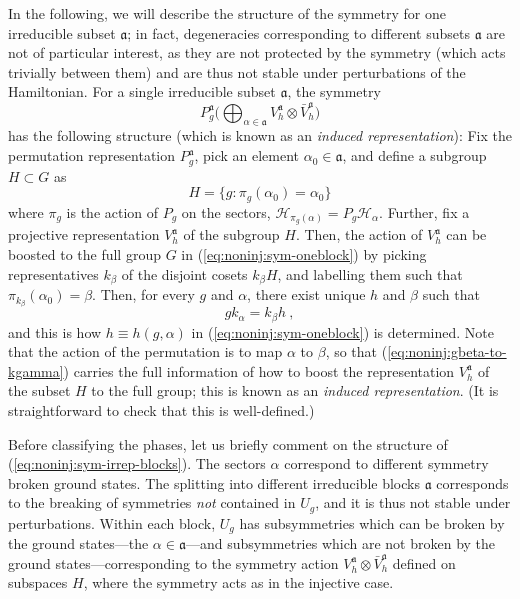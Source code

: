 \documentclass[twocolumn,superscriptaddress,prb,linenumbers]{revtex4-1}
\newcommand{\mc}[1]{\mathcal{#1}}
\newcommand{\mf}[1]{\mathfrak{#1}}
\begin{document}
In the following, we will describe the structure of the symmetry for one
irreducible subset $\mathfrak a$; in fact, degeneracies corresponding to
different subsets $\mathfrak a$ are not of particular interest, as they
are not protected by the symmetry (which acts trivially between them) and
are thus not stable under perturbations of the Hamiltonian.  For a single
irreducible subset $\mathfrak a$,  the symmetry
\begin{equation}
    \label{eq:noninj:sym-oneblock}
    P_g^{\mathfrak a}
    \Big(\bigoplus_{\alpha\in \mathfrak a}
    V_h^{\mathfrak a}\otimes \bar V_h^{\mathfrak a}\Big)
\end{equation}
has the following structure (which is known as an \emph{induced
    representation}): Fix the permutation representation $P_g^{\mf
            a}$, pick an element $\alpha_0\in \mf a$, and define a subgroup
$H\subset G$ as
\[
    H=\{g:\pi_g(\alpha_0)=\alpha_0\}
\]
where $\pi_g$ is the action of $P_g$ on the sectors,
$\mc H_{\pi_g(\alpha)}=P_g \mc H_\alpha$. Further, fix a projective
representation $V_h^{\mf a}$ of the subgroup $H$. Then, the action of
$V_h^{\mf a}$ can be boosted to the full group $G$ in
(\ref{eq:noninj:sym-oneblock}) by picking representatives $k_\beta$ of the
disjoint cosets $k_\beta H$, and labelling them such that
$\pi_{k_\beta}(\alpha_0)=\beta$. Then, for every $g$ and $\alpha$, there
exist unique $h$ and $\beta$ such that
\begin{equation}
    \label{eq:noninj:gbeta-to-kgamma}
    gk_\alpha=k_\beta h\ ,
\end{equation}
and this is how $h\equiv h(g,\alpha)$ in (\ref{eq:noninj:sym-oneblock}) is
determined. Note that the action of the permutation is to map $\alpha$ to
$\beta$, so that (\ref{eq:noninj:gbeta-to-kgamma}) carries the full
information of how to boost the representation $V_h^{\mf a}$ of the subset
$H$ to the full group; this is known as an \emph{induced representation}.
(It is straightforward to check that this is well-defined.)

Before classifying the phases, let us briefly comment on the structure of
(\ref{eq:noninj:sym-irrep-blocks}). The sectors $\alpha$ correspond to
different symmetry broken ground states. The splitting into different
irreducible blocks $\mf a$ corresponds to the breaking of symmetries
\emph{not} contained in $U_g$, and it is thus not stable under
perturbations. Within each block, $U_g$ has subsymmetries which can be
broken by the ground states---the $\alpha\in\mf a$---and subsymmetries
which are not broken by the ground states---corresponding to the symmetry
action $V_h^{\mf a}\otimes \bar V_h^{\mf a}$ defined on subspaces $H$,
where the symmetry acts as in the injective case.
\end{document}
